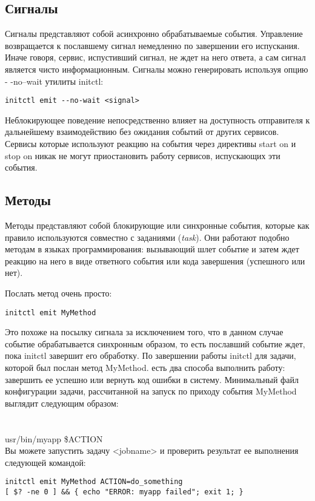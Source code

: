 \subsection*{Сигналы}
Сигналы представляют собой асинхронно обрабатываемые события. Управление возвращается к пославшему сигнал немедленно по завершении его испускания. Иначе говоря, сервис, испустивший сигнал, не ждет на него ответа, 
а сам сигнал является чисто информационным. Сигналы можно генерировать используя опцию \\- -no--wait утилиты initctl: \begin{verbatim}
initctl emit --no-wait <signal>
\end{verbatim} Неблокирующее поведение непосредственно влияет на доступность отправителя к дальнейшему взаимодействию без ожидания событий от других сервисов. Сервисы которые используют реакцию на события через директивы start on и stop on никак не могут приостановить работу сервисов, испускающих эти события.
\subsection*{Методы}
Методы представляют собой блокирующие или синхронные события, которые как правило используются совместно с заданиями (\textit{task}). Они работают подобно методам в языках программирования: вызывающий шлет событие 
и затем ждет реакцию на него в виде ответного события или кода завершения (успешного или нет).

Послать метод очень просто: \begin{verbatim}
initctl emit MyMethod
\end{verbatim} Это похоже на посылку сигнала за исключением того, что в данном случае событие обрабатывается синхронным образом, то есть пославший событие ждет, пока initctl завершит его обработку. По завершении работы initctl для задачи, которой был послан метод MyMethod. есть два способа выполнить работу: завершить ее успешно или вернуть код ошибки в систему. Минимальный файл конфигурации задачи, рассчитанной на запуск по приходу события MyMethod выглядит следующим образом: \\
 \\
 \\
 \/usr/bin/myapp \$ACTION \\

Вы можете запустить задачу <jobname> и проверить результат ее выполнения следующей командой: \begin{verbatim}
initctl emit MyMethod ACTION=do_something
[ $? -ne 0 ] && { echo "ERROR: myapp failed"; exit 1; }
\end{verbatim} 
